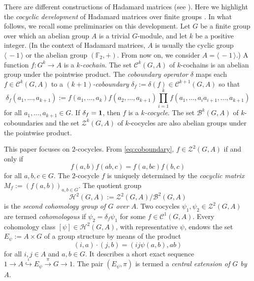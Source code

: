 \documentclass[11pt,a4paper]{article}
\begin{document}
There are different constructions of Hadamard matrices (see \citealp{Hor07}). Here we highlight the {\em cocyclic development} of Hadamard matrices over finite groups \citep{HdL95}. In what follows, we recall some preliminaries on this development. Let $G$ be a finite group over which an abelian group $A$ is a trivial $G$-module, and let $k$ be a positive integer. (In the context of Hadamard matrices, $A$ is usually the cyclic group $\langle\,-1\,\rangle$ or the abelian group $(\mathbb{F}_2,+)$. From now on, we consider $A=\langle\,-1\,\rangle$.) A function $f:G^k\to A$ is a {\em $k$-cochain}. The set $\mathcal{C}^k(G,A)$ of $k$-cochains is an abelian group under the pointwise product. The {\em coboundary operator}
$\delta$ maps each $f\in \mathcal{C}^k\left(G,A\right)$ to a {\em $(k+1)$-coboundary} $\delta_f:=\delta(f)\in\mathcal{C}^{k+1}\left(G,A\right)$ so that
\begin{equation}\label{eq:coboundary}
\delta_f(a_1,\ldots,a_{k+1}):=f(a_1,\ldots,a_k)f(a_2,\ldots,a_{k+1})\prod_{i=1}^kf(a_1,\ldots,a_ia_{i+1},\ldots,a_{k+1})
\end{equation}
for all $a_1,\ldots,a_{k+1}\in G$. If $\delta_f={\bf 1}$, then $f$ is a {\em $k$-cocycle}. The set $\mathcal{B}^k(G,A)$ of $k$-coboundaries and the set $\mathcal{Z}^k(G,A)$ of $k$-cocycles are also abelian groups under the pointwise product.

This paper focuses on $2$-cocycles. From \eqref{eq:coboundary}, $f\in \mathcal{Z}^2(G,A)$ if and only if
\begin{equation}\label{HdLCoc}
f(a,b)f(ab,c)=f(a,bc)f(b,c)
\end{equation}
for all $a,b,c\in G$. The $2$-cocycle $f$ is uniquely determined by the {\em cocyclic matrix} $M_f:=\left(f(a,b)\right)_{a,b\in G}$. The quotient group
\[\mathcal{H}^2(G,A):=\mathcal{Z}^2(G,A)/\mathcal{B}^2(G,A)\]
is the {\em second cohomology group of $G$ over $A$}. Two cocycles $\psi_1,\psi_2\in\mathcal{Z}^2\left(G,A\right)$ are termed {\em cohomologous} if $\psi_2=\delta_f\psi_1$ for some $f\in \mathcal{C}^1\left(G,A\right)$. Every cohomology class $[\psi]\in \mathcal{H}^2(G,A)$, with representative $\psi$, endows the set $E_\psi:=A\times G$ of a group structure by means of the product
\begin{equation}\label{eq:extension}
(i,a)\cdot (j,b)=(ij\psi(a,b),ab)
\end{equation}
for all $i,j\in A$ and $a,b\in G$. It describes a short exact sequence $1\rightarrow A  \overset{\iota}{\hookrightarrow} E_\psi \xrightarrow{\pi} G\rightarrow 1$. The pair $(E_\psi,\pi)$ is termed a {\em central extension of $G$ by $A$}.
\end{document}
